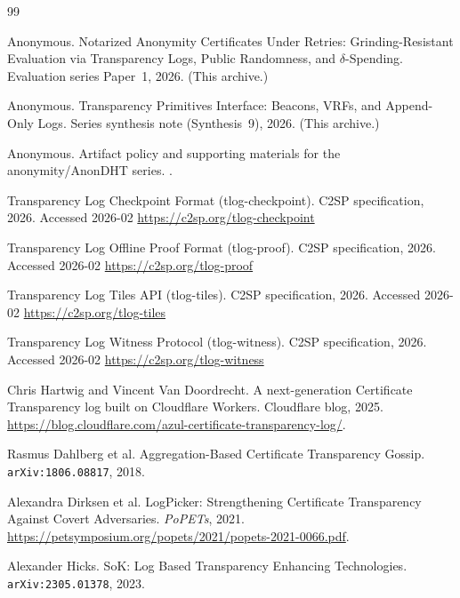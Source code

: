 \documentclass[11pt]{article}
\begin{document}
\begin{thebibliography}{99}

Anonymous.
\newblock Notarized Anonymity Certificates Under Retries: Grinding-Resistant Evaluation via Transparency Logs, Public Randomness, and $\delta$-Spending.
\newblock Evaluation series Paper~1, 2026. (This archive.)

Anonymous.
\newblock Transparency Primitives Interface: Beacons, VRFs, and Append-Only Logs.
\newblock Series synthesis note (Synthesis~9), 2026. (This archive.)

Anonymous.
\newblock Artifact policy and supporting materials for the anonymity/AnonDHT series.
.

\newblock Transparency Log Checkpoint Format (tlog-checkpoint).
\newblock C2SP specification, 2026.
\newblock Accessed 2026-02
\newblock \url{https://c2sp.org/tlog-checkpoint}

\newblock Transparency Log Offline Proof Format (tlog-proof).
\newblock C2SP specification, 2026.
\newblock Accessed 2026-02
\newblock \url{https://c2sp.org/tlog-proof}

\newblock Transparency Log Tiles API (tlog-tiles).
\newblock C2SP specification, 2026.
\newblock Accessed 2026-02
\newblock \url{https://c2sp.org/tlog-tiles}

\newblock Transparency Log Witness Protocol (tlog-witness).
\newblock C2SP specification, 2026.
\newblock Accessed 2026-02
\newblock \url{https://c2sp.org/tlog-witness}

Chris Hartwig and Vincent Van Doordrecht.
\newblock A next-generation Certificate Transparency log built on Cloudflare Workers.
\newblock Cloudflare blog, 2025.
\newblock \url{https://blog.cloudflare.com/azul-certificate-transparency-log/}.

Rasmus Dahlberg et al.
\newblock Aggregation-Based Certificate Transparency Gossip.
\newblock \texttt{arXiv:1806.08817}, 2018.

Alexandra Dirksen et al.
\newblock LogPicker: Strengthening Certificate Transparency Against Covert Adversaries.
\newblock \emph{PoPETs}, 2021.
\newblock \url{https://petsymposium.org/popets/2021/popets-2021-0066.pdf}.

Alexander Hicks.
\newblock SoK: Log Based Transparency Enhancing Technologies.
\newblock \texttt{arXiv:2305.01378}, 2023.


\end{thebibliography}
\end{document}
